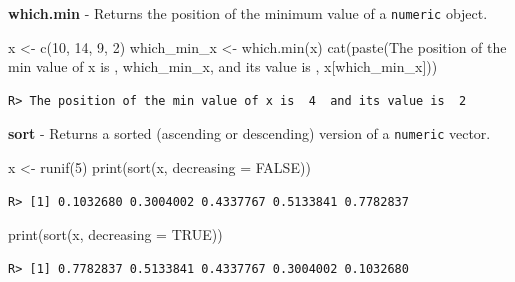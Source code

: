 \documentclass[
  12pt,
]{book}
\newenvironment{Shaded}{\begin{snugshade}}{\end{snugshade}}
\newcommand{\AttributeTok}[1]{\textcolor[rgb]{0.61,0.61,0.61}{#1}}
\newcommand{\ConstantTok}[1]{\textcolor[rgb]{0,0,0}{#1}}
\newcommand{\DecValTok}[1]{\textcolor[rgb]{0.06,0.06,0.06}{#1}}
\newcommand{\FunctionTok}[1]{\textcolor[rgb]{0,0,0}{#1}}
\newcommand{\NormalTok}[1]{#1}
\newcommand{\OtherTok}[1]{\textcolor[rgb]{0.37,0.37,0.37}{#1}}
\newcommand{\StringTok}[1]{\textcolor[rgb]{0.5,0.5,0.5}{#1}}
\begin{document}
\textbf{which.min} - Returns the position of the minimum value of a \texttt{numeric} object. 

\begin{Shaded}
\begin{Highlighting}[]
\NormalTok{x }\OtherTok{\textless{}{-}} \FunctionTok{c}\NormalTok{(}\DecValTok{10}\NormalTok{, }\DecValTok{14}\NormalTok{, }\DecValTok{9}\NormalTok{, }\DecValTok{2}\NormalTok{)}
\NormalTok{which\_min\_x }\OtherTok{\textless{}{-}} \FunctionTok{which.min}\NormalTok{(x)}
\FunctionTok{cat}\NormalTok{(}\FunctionTok{paste}\NormalTok{(}\StringTok{\textquotesingle{}The position of the min value of x is \textquotesingle{}}\NormalTok{,}
\NormalTok{          which\_min\_x, }\StringTok{\textquotesingle{} and its value is \textquotesingle{}}\NormalTok{, x[which\_min\_x]))}
\end{Highlighting}
\end{Shaded}

\begin{verbatim}
R> The position of the min value of x is  4  and its value is  2
\end{verbatim}

\textbf{sort} - Returns a sorted (ascending or descending) version of a \texttt{numeric} vector. 

\begin{Shaded}
\begin{Highlighting}[]
\NormalTok{x }\OtherTok{\textless{}{-}} \FunctionTok{runif}\NormalTok{(}\DecValTok{5}\NormalTok{)}
\FunctionTok{print}\NormalTok{(}\FunctionTok{sort}\NormalTok{(x, }\AttributeTok{decreasing =} \ConstantTok{FALSE}\NormalTok{))}
\end{Highlighting}
\end{Shaded}

\begin{verbatim}
R> [1] 0.1032680 0.3004002 0.4337767 0.5133841 0.7782837
\end{verbatim}

\begin{Shaded}
\begin{Highlighting}[]
\FunctionTok{print}\NormalTok{(}\FunctionTok{sort}\NormalTok{(x, }\AttributeTok{decreasing =} \ConstantTok{TRUE}\NormalTok{))}
\end{Highlighting}
\end{Shaded}

\begin{verbatim}
R> [1] 0.7782837 0.5133841 0.4337767 0.3004002 0.1032680
\end{verbatim}
\end{document}
